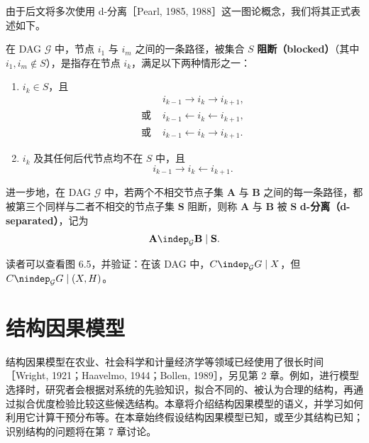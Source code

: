 由于后文将多次使用 d-分离［Pearl, 1985, 1988］这一图论概念，我们将其正式表述如下。

\begin{definition}[Pearl 的 d-分离]
在 DAG $\mathcal G$ 中，节点 $i_1$ 与 $i_m$ 之间的一条路径，被集合 $S$ \textbf{阻断（blocked）}（其中 $i_1,i_m\notin S$），是指存在节点 $i_k$，满足以下两种情形之一：
\begin{enumerate}[label=(\roman*)]
 \item $i_k\in S$，且
 \[
 \begin{aligned}
 &i_{k-1}\to i_k\to i_{k+1},\\
 \text{或 }&i_{k-1}\leftarrow i_k\leftarrow i_{k+1},\\
 \text{或 }&i_{k-1}\leftarrow i_k\to i_{k+1}.
 \end{aligned}
 \]
 \item $i_k$ 及其任何后代节点均不在 $S$ 中，且
 \[
 i_{k-1}\to i_k\leftarrow i_{k+1}.
 \]
\end{enumerate}
进一步地，在 DAG $\mathcal G$ 中，若两个不相交节点子集 $\mathbf A$ 与 $\mathbf B$ 之间的每一条路径，都被第三个同样与二者不相交的节点子集 $\mathbf S$ 阻断，则称 $\mathbf A$ 与 $\mathbf B$ 被 $\mathbf S$ \textbf{d-分离（d-separated）}，记为
\[
 \mathbf A\indep_{\mathcal G}\mathbf B\mid\mathbf S.
\]
\end{definition}

读者可以查看图 6.5，并验证：在该 DAG 中，$C\indep_{\mathcal G}G\mid X$，但 $C\nindep_{\mathcal G}G\mid(X,H)$。

\section{结构因果模型}
\label{sec:ch06-scm}

结构因果模型在农业、社会科学和计量经济学等领域已经使用了很长时间［Wright, 1921；Haavelmo, 1944；Bollen, 1989］，另见第 2 章。例如，进行模型选择时，研究者会根据对系统的先验知识，拟合不同的、被认为合理的结构，再通过拟合优度检验比较这些候选结构。本章将介绍结构因果模型的语义，并学习如何利用它计算干预分布等。在本章始终假设结构因果模型已知，或至少其结构已知；识别结构的问题将在第 7 章讨论。

